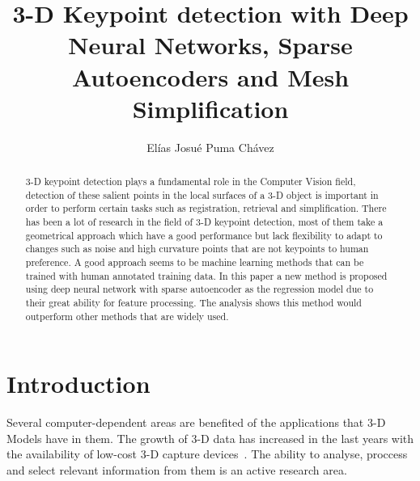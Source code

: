 \documentclass{comjnl}
\begin{document}
\title[3-D Keypoint detection with DNNs]{3-D Keypoint detection with Deep Neural Networks,
Sparse Autoencoders and Mesh Simplification}
\author{El\'{i}as Josu\'{e} Puma Ch\'{a}vez}






\begin{abstract}
3-D keypoint detection plays a fundamental role in the Computer Vision field, detection
of these salient points in the local surfaces of a 3-D object is important in order to 
perform certain tasks such as registration, retrieval and simplification. There has been
a lot of research in the field of 3-D keypoint detection, most of them take a geometrical 
approach which have a good performance but lack flexibility to adapt to changes such as
noise and high curvature points that are not keypoints to human preference. A good
approach seems to be machine learning methods that can be trained with human annotated 
training data. In this paper a new method is proposed using deep neural network with 
sparse autoencoder as the regression model due to their great ability for feature processing. 
The analysis shows this method would outperform other methods that are widely used. 
\end{abstract}

\maketitle


\section{Introduction}
Several computer-dependent areas are benefited of the applications
that 3-D Models have in them. The growth of 3-D data has increased in
the last years with the availability of low-cost 3-D capture devices~\cite{Sipiran2011}.
The ability to analyse, proccess and select relevant information
from them is an active research area. 
\end{document}
